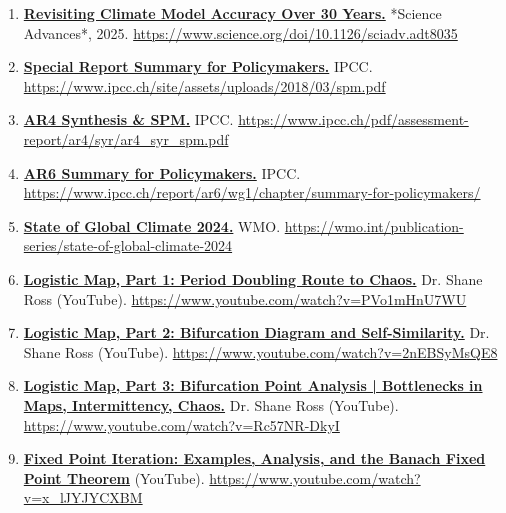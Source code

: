 \documentclass[
  10pt,
  a4paper,
  DIV=11,
  numbers=noendperiod,
  open=any]{scrreprt}
\numberwithin{equation}{chapter}
\numberwithin{equation}{section}
\renewcommand{\[}{\begin{equation}}
\renewcommand{\]}{\end{equation}}
\begin{document}
\begin{enumerate}
  \item \label{ref:web25}\href{https://www.science.org/doi/10.1126/sciadv.adt8035}{\textbf{Revisiting Climate Model Accuracy Over 30 Years.}} *Science Advances*, 2025.  
  \url{https://www.science.org/doi/10.1126/sciadv.adt8035}

  \item \label{ref:web26}\href{https://www.ipcc.ch/site/assets/uploads/2018/03/spm.pdf}{\textbf{Special Report Summary for Policymakers.}} IPCC.  
  \url{https://www.ipcc.ch/site/assets/uploads/2018/03/spm.pdf}

  \item \label{ref:web27}\href{https://www.ipcc.ch/pdf/assessment-report/ar4/syr/ar4_syr_spm.pdf}{\textbf{AR4 Synthesis & SPM.}} IPCC.  
  \url{https://www.ipcc.ch/pdf/assessment-report/ar4/syr/ar4_syr_spm.pdf}

  \item \label{ref:web28}\href{https://www.ipcc.ch/report/ar6/wg1/chapter/summary-for-policymakers/}{\textbf{AR6 Summary for Policymakers.}} IPCC.  
  \url{https://www.ipcc.ch/report/ar6/wg1/chapter/summary-for-policymakers/}

  \item \label{ref:web29}\href{https://wmo.int/publication-series/state-of-global-climate-2024}{\textbf{State of Global Climate 2024.}} WMO.  
  \url{https://wmo.int/publication-series/state-of-global-climate-2024}

  \item \label{ref:web30}\href{https://www.youtube.com/watch?v=PVo1mHnU7WU}{\textbf{Logistic Map, Part 1: Period Doubling Route to Chaos.}} Dr. Shane Ross (YouTube).  
  \url{https://www.youtube.com/watch?v=PVo1mHnU7WU}

  \item \label{ref:web31}\href{https://www.youtube.com/watch?v=2nEBSyMsQE8}{\textbf{Logistic Map, Part 2: Bifurcation Diagram and Self-Similarity.}} Dr. Shane Ross (YouTube).  
  \url{https://www.youtube.com/watch?v=2nEBSyMsQE8}

  \item \label{ref:web32}\href{https://www.youtube.com/watch?v=Rc57NR-DkyI}{\textbf{Logistic Map, Part 3: Bifurcation Point Analysis | Bottlenecks in Maps, Intermittency, Chaos.}} Dr. Shane Ross (YouTube).  
  \url{https://www.youtube.com/watch?v=Rc57NR-DkyI}

  \item \label{ref:web33}\href{https://www.youtube.com/watch?v=x_lJYJYCXBM}{\textbf{Fixed Point Iteration: Examples, Analysis, and the Banach Fixed Point Theorem}} (YouTube).  
  \url{https://www.youtube.com/watch?v=x_lJYJYCXBM}



\end{enumerate}
\end{document}
